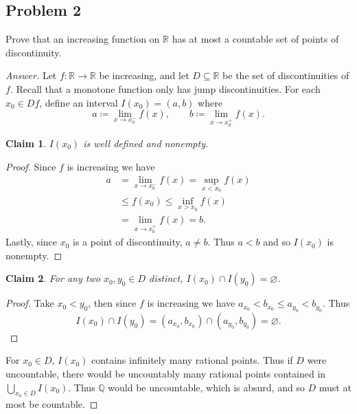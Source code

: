 \documentclass[12pt]{article}
\newcommand{\q}{\mathbb{Q}}
\newcommand{\real}{\mathbb{R}}
\newcommand\paren[1]{\left( #1 \right)}
\newtheorem*{claim}{Claim}
\theoremstyle{definition}
\begin{document}
\subsection{Problem 2 \texorpdfstring{\cite{Lin}}{}}
Prove that an increasing function on $\real$ has at most a countable set of points of discontinuity.
\begin{proof}[Answer]
    Let $f : \real \to \real$ be increasing, and let $D \subseteq \real$ be the set of discontinuities of $f$. Recall that a monotone function only has jump discontinuities. For each $x_0 \in Df$, define an interval $I \paren{ x_0 } = (a,b)$ where 
    \[
        a \coloneqq \lim\limits_{x \to x_0^-} f(x) , \qquad b \coloneqq \lim\limits_{x \to x_0^+} f(x).
    \]
    \begin{claim}
        $I \paren{ x_0 }$ is well defined and nonempty.
    \end{claim}
    \begin{proof}
        Since $f$ is increasing we have
        \begin{align*}
            a & = \lim\limits_{x \to x_0^-} f(x) = \sup\limits_{x < x_0} f(x) \\
            & \leq f \paren{ x_0 } \leq \inf\limits_{x > x_0} f(x) \\
            & = \lim\limits_{x \to x_0^+} f(x) = b.
        \end{align*}
        Lastly, since $x_0$ is a point of discontinuity, $a \neq b$. Thus $a < b$ and so $I \paren{ x_0 }$ is nonempty.
    \end{proof}
    \begin{claim}
        For any two $x_0 , y_0 \in D$ distinct, $I \paren{ x_0 } \cap I \paren{ y_0 } = \varnothing$.
    \end{claim}
    \begin{proof}
        Take $x_0 < y_0$, then since $f$ is increasing we have $a_{x_0} < b_{x_0} \leq a_{y_0} < b_{y_0}$. Thus 
        \[
            I \paren{ x_0 } \cap I \paren{ y_0 } = \paren{ a_{x_0} , b_{x_0} } \cap \paren{ a_{y_0} , b_{y_0} } = \varnothing.
        \]
    \end{proof}
    For $x_0 \in D$, $I \paren{ x_0 }$ contains infinitely many rational points. Thus if $D$ were uncountable, there would be uncountably many rational points contained in $\bigcup\limits_{x_0 \in D} I \paren{ x_0 }$. Thus $\q$ would be uncountable, which is absurd, and so $D$ must at most be countable.
\end{proof}
\end{document}
